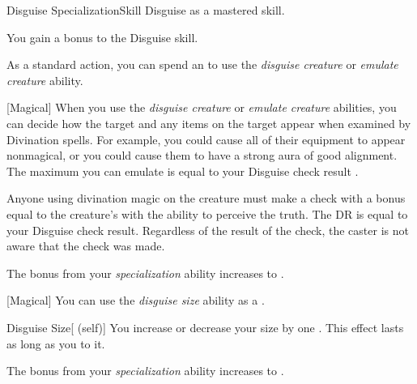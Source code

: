     \begin{feat}{Disguise Specialization}{Skill}
        \featpre Disguise as a mastered skill.

         You gain a  bonus to the Disguise skill.

         As a standard action, you can spend an  to use the \textit{disguise creature} or \textit{emulate creature} ability.

        [Magical] When you use the \textit{disguise creature} or \textit{emulate creature} abilities, you can decide how the target and any items on the target appear when examined by Divination spells.
        For example, you could cause all of their equipment to appear nonmagical, or you could cause them to have a strong aura of good alignment.
        The maximum  you can emulate is equal to your Disguise check result .

        Anyone using divination magic on the creature must make a check with a bonus equal to the creature's  with the ability to perceive the truth.
        The DR is equal to your Disguise check result.
        Regardless of the result of the check, the caster is not aware that the check was made.

         The bonus from your \textit{specialization} ability increases to .

        [Magical] You can use the \textit{disguise size} ability as a .
        \begin{attuneability}{Disguise Size}[ (self)]
            You increase or decrease your size by one .
            This effect lasts as long as you  to it.
        \end{attuneability}

         The bonus from your \textit{specialization} ability increases to .
    \end{feat}


